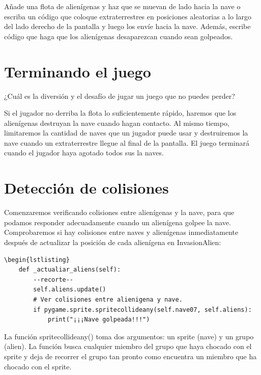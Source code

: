 Añade una flota de alienígenas y haz que se muevan de lado hacia la nave o escriba un código que coloque extraterrestres en posiciones aleatorias a lo largo del lado derecho de la pantalla y luego los envíe hacia la nave. Además, escribe código que haga que los alienígenas desaparezcan cuando sean golpeados.

\section{Terminando el juego}

¿Cuál es la diversión y el desafío de jugar un juego que no puedes perder? 

Si el jugador no derriba la flota lo suficientemente rápido, haremos que los alienígenas destruyan la nave cuando hagan contacto. 
Al mismo tiempo, limitaremos la cantidad de naves que un jugador puede usar y destruiremos la nave cuando un extraterrestre llegue al final de la pantalla. El juego terminará cuando el jugador haya agotado todos sus la naves.

\section{Detección de colisiones}

Comenzaremos verificando colisiones entre alienígenas y la nave, para que podamos responder adecuadamente cuando un 
alienígena  golpee la nave. Comprobaremos si hay colisiones entre naves y alienígenas inmediatamente después de actualizar la posición de cada alienígena en {\ttfamily InvasionAlien}:


\hspace{-2.4cm}{\ttfamily \scriptsize invasión}

\vspace{-0.2cm}
\hspace{-2.1cm}{\ttfamily \scriptsize \_alien.py}\vspace{-0.84cm}
\begin{lstlisting}
\begin{lstlisting}
    def _actualiar_aliens(self):
        --recorte--
        self.aliens.update()
        # Ver colisiones entre alienigena y nave.
        if pygame.sprite.spritecollideany(self.nave07, self.aliens):
            print("¡¡¡Nave golpeada!!!")
\end{lstlisting}

La función {\ttfamily spritecollideany()} toma dos argumentos: un sprite (nave) y un grupo (alien). La función busca cualquier miembro del grupo que haya  chocado con el sprite y deja de recorrer el grupo tan pronto como encuentra un miembro que ha chocado con el sprite. 

